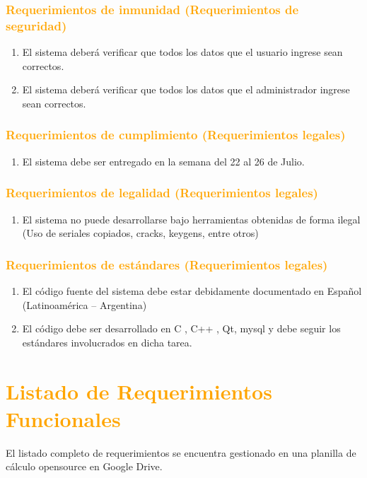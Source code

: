 \subsubsection{\textcolor{orange}{Requerimientos de inmunidad
(Requerimientos de seguridad)}}
\begin{enumerate}
\item El sistema deberá verificar que todos los datos que el usuario ingrese
sean correctos.
\item El sistema deberá verificar que todos los datos que el administrador
ingrese sean correctos.
\end{enumerate}

\subsubsection{\textcolor{orange}{Requerimientos de cumplimiento
(Requerimientos legales)}}
\begin{enumerate}
\item El sistema debe ser entregado en la semana del 22 al 26 de Julio.
\end{enumerate}


\subsubsection{\textcolor{orange}{Requerimientos de legalidad (Requerimientos
legales)}}
\begin{enumerate}
\item El sistema no puede desarrollarse bajo herramientas obtenidas de forma
ilegal (Uso de seriales copiados, cracks, keygens, entre otros)
\end{enumerate}

\subsubsection{\textcolor{orange}{Requerimientos de estándares (Requerimientos
legales)}}
\begin{enumerate}
\item El código fuente del sistema debe estar debidamente documentado en
Español (Latinoamérica – Argentina)
\item El código debe ser desarrollado en C , C++ , Qt, mysql y debe seguir los
estándares involucrados en dicha tarea.
\end{enumerate}

\section{\textcolor{orange}{Listado de Requerimientos Funcionales}}
El listado completo de requerimientos se encuentra gestionado en una planilla de
cálculo opensource en Google Drive.


